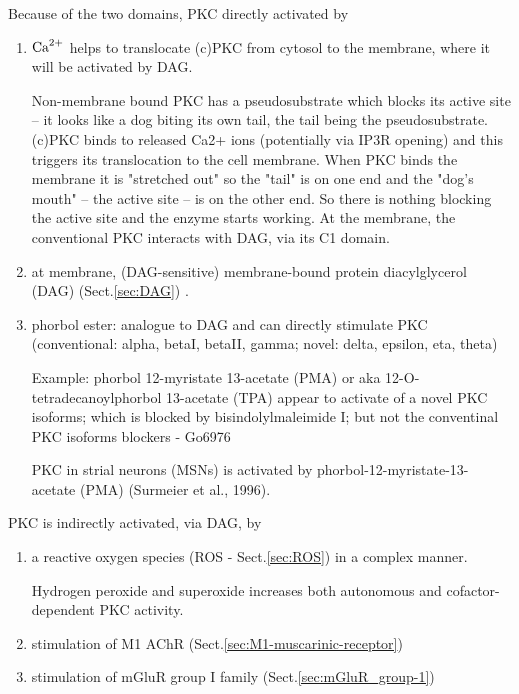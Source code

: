 Because of the two domains, PKC directly activated by
\begin{enumerate}
  
  \item  ${\text{Ca}^{2+}}$ helps to translocate (c)PKC from cytosol to the membrane, where it
will be activated by DAG.

Non-membrane bound PKC has a pseudosubstrate which blocks its active site -- it
looks like a dog biting its own tail, the tail being the pseudosubstrate.  
(c)PKC binds to released Ca2+ ions (potentially via IP3R opening) and
this triggers its translocation to the cell membrane.
When PKC binds the membrane it is "stretched out" so the "tail" is on one end
and the "dog's mouth" -- the active site -- is on the other end.   So there is
nothing blocking the active site and the enzyme starts working.
At the membrane, the conventional PKC interacts with DAG, via its C1 domain.

  \item at membrane, (DAG-sensitive) membrane-bound protein diacylglycerol
  (DAG) (Sect.\ref{sec:DAG}) .



  \item phorbol ester: analogue to DAG and can directly stimulate PKC 
  (conventional: alpha, betaI, betaII, gamma; novel: delta, epsilon, eta, theta) 

Example:  phorbol 12-myristate 13-acetate (PMA) or aka 12-O-tetradecanoylphorbol
13-acetate (TPA) appear to activate of a novel PKC isoforms; which is blocked by
bisindolylmaleimide I; but not the conventinal PKC isoforms blockers - Go6976

PKC in strial neurons (MSNs) is activated by phorbol-12-myristate-13-acetate
(PMA) (Surmeier et al., 1996). 
  
\end{enumerate}

PKC is indirectly activated, via DAG, by 
\begin{enumerate}
  \item  a reactive oxygen species (ROS - Sect.\ref{sec:ROS}) in a complex
  manner.

Hydrogen peroxide and superoxide increases both autonomous and
cofactor-dependent PKC activity.

  \item stimulation of M1 AChR (Sect.\ref{sec:M1-muscarinic-receptor})

  \item stimulation of mGluR group I family (Sect.\ref{sec:mGluR_group-1})  
\end{enumerate}


